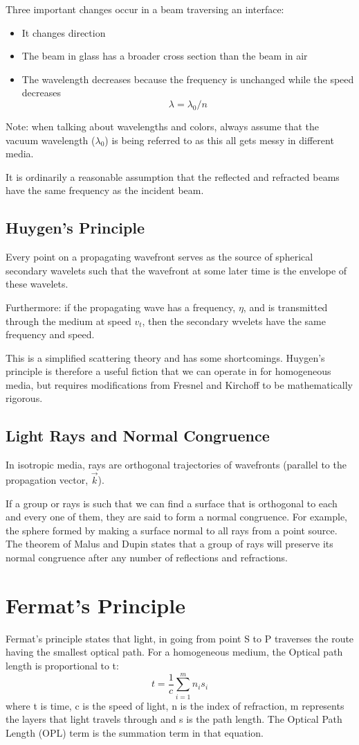 \documentclass[12pt]{report}
\begin{document}
Three important changes occur in a beam traversing an interface:
\begin{itemize}
\item It changes direction
\item The beam in glass has a broader cross section than the beam in air
\item The wavelength decreases because the frequency is unchanged while the speed decreases \[\lambda = \lambda_0/n\]
\end{itemize}
Note: when talking about wavelengths and colors, always assume that the vacuum wavelength ($\lambda_0$) is being referred to as this all gets messy in different media. 

It is ordinarily a reasonable assumption that the reflected and refracted beams have the same frequency as the incident beam. 
\subsection{Huygen's Principle}
Every point on a propagating wavefront serves as the source of spherical secondary wavelets such that the wavefront at some later time is the envelope of these wavelets. 

Furthermore: if the propagating wave has a frequency, $\eta$, and is transmitted through the medium at speed $v_t$, then the secondary wvelets have the same frequency and speed. 

This is a simplified scattering theory and has some shortcomings. Huygen's principle is therefore a useful fiction that we can operate in for homogeneous media, but requires modifications from Fresnel and Kirchoff to be mathematically rigorous.
\subsection{Light Rays and Normal Congruence}
In isotropic media, rays are orthogonal trajectories of wavefronts (parallel to the propagation vector, $\vec{k}$).

If a group or rays is such that we can find a surface that is orthogonal to each and every one of them, they are said to form a normal congruence. For example, the sphere formed by making a surface normal to all rays from a point source. The theorem of Malus and Dupin states that a group of rays will preserve its normal congruence after any number of reflections and refractions. 
\section{Fermat's Principle}
Fermat's principle states that light, in going from point S to P traverses the route having the smallest optical path. For a homogeneous medium, the Optical path length is proportional to t:
\begin{equation}
t = \frac{1}{c}\sum_{i=1}^m n_is_i
\end{equation}
where t is time, c is the speed of light, n is the index of refraction, m represents the layers that light travels through and s is the path length. The Optical Path Length (OPL) term is the summation term in that equation.
\end{document}
